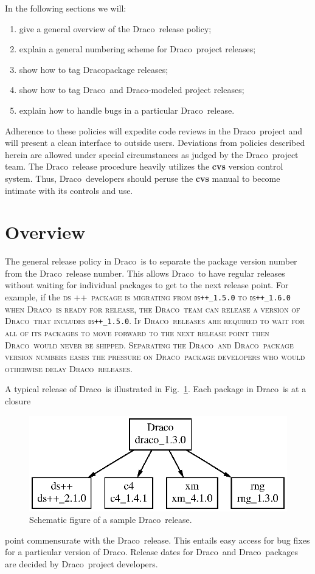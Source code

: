 \documentclass[11pt]{nmemo}
\newcommand{\draco}{\normalfont\normalsize\textsf Draco}
\newcommand{\dsxx}{\normalfont\normalsize\scshape ds\raisebox{.2ex}
  {\scriptsize ++}}
\begin{document}
In the following sections we will:
\begin{enumerate}
\item give a general overview of the \draco\ release policy;
\item explain a general numbering scheme for \draco\ project releases;
\item show how to tag \draco package releases;
\item show how to tag \draco\ and \draco-modeled project releases;
\item explain how to handle bugs in a particular \draco\ release.
\end{enumerate}
Adherence to these policies will expedite code reviews in the \draco\ 
project and will present a clean interface to outside users.
Deviations from policies described herein are allowed under special
circumstances as judged by the \draco\ project team.  The \draco\ 
release procedure heavily utilizes the {\bf cvs} version control
system.  Thus, \draco\ developers should peruse the {\bf cvs} manual
to become intimate with its controls and use.


\section{Overview}

The general release policy in \draco\ is to separate the package
version number from the \draco\ release number.  This allows \draco\
to have regular releases without waiting for individual packages to
get to the next release point.  For example, if the \dsxx\ package is
migrating from \texttt{ds++\_1.5.0} to \texttt{ds++\_1.6.0} when
\draco\ is ready for release, the \draco\ team can release a version
of \draco\ that includes \texttt{ds++\_1.5.0}.  If \draco\ releases are 
required to wait for all of its packages to move forward to the next
release point then \draco\ would never be shipped.  Separating the
\draco\ and \draco\ package version numbers eases the pressure on \draco\
package developers who would otherwise delay \draco\ releases.

A typical release of \draco\ is illustrated in
Fig.~\ref{fig:drelease}.  Each package in \draco\ is at a closure
\begin{figure}
  \centerline{\includegraphics{drelease.eps}}
  \caption{Schematic figure of a sample \draco\ release.}
  \label{fig:drelease}
\end{figure}
point commensurate with the \draco\ release.  This entails easy access
for bug fixes for a particular version of \draco.  Release dates for
\draco\ and \draco\ packages are decided by \draco\ project
developers.
 
\end{document}
